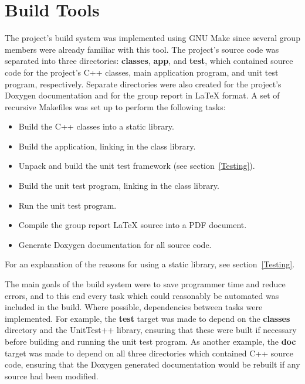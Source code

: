 \section{Build Tools}
\label{Build Tools}
The project's build system was implemented using GNU Make since several group members were already familiar with this tool.  The project's source code was separated into three directories: \textbf{classes}, \textbf{app}, and \textbf{test}, which contained source code for the project's C++ classes, main application program, and unit test program, respectively.  Separate directories were also created for the project's Doxygen documentation and for the group report in LaTeX format.  A set of recursive Makefiles was set up to perform the following tasks:

\begin{itemize}

  \item Build the C++ classes into a static library.
  \item Build the application, linking in the class library.
  \item Unpack and build the unit test framework (see section~\ref{Testing}).
  \item Build the unit test program, linking in the class library.
  \item Run the unit test program.
  \item Compile the group report LaTeX source into a PDF document.
  \item Generate Doxygen documentation for all source code.

\end{itemize}

For an explanation of the reasons for using a static library, see section~\ref{Testing}.  

The main goals of the build system were to save programmer time and reduce errors, and to this end every task which could reasonably be automated was included in the build.  Where possible, dependencies between tasks were implemented.  For example, the \textbf{test} target was made to depend on the \textbf{classes} directory and the UnitTest++ library, ensuring that these were built if necessary before building and running the unit test program.  As another example, the \textbf{doc} target was made to depend on all three directories which contained C++ source code, ensuring that the Doxygen generated documentation would be rebuilt if any source had been modified.

